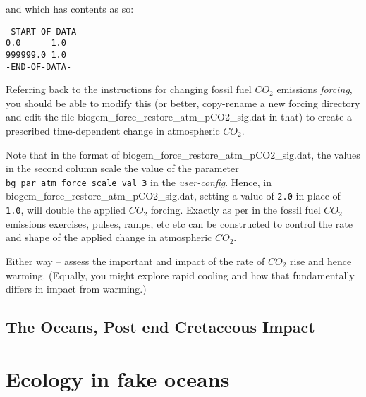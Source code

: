 \documentclass[11pt,fleqn]{book} %
\begin{document}
\begin{enumerate}[noitemsep]
\vspace{8mm}
\pagebreak 

and which has contents as so:
\vspace{-1mm}\small\begin{verbatim}
-START-OF-DATA-
0.0      1.0
999999.0 1.0
-END-OF-DATA-
\end{verbatim}\normalsize\vspace{-1mm}

Referring back to the instructions for changing fossil fuel \(CO_{2}\) emissions \textit{forcing}, you should be able to modify this (or better, copy-rename a new forcing directory and edit the file \textsf{\footnotesize biogem\_force\_restore\_atm\_pCO2\_sig.dat} in that) to create a prescribed time-dependent change in atmospheric \(CO_{2}\).

Note that in the format of \textsf{\footnotesize biogem\_force\_restore\_atm\_pCO2\_sig.dat}, the values in the second column scale the value of the parameter \texttt{bg\_par\_atm\_force\_scale\_val\_3} in the \textit{user-config}. Hence, in \textsf{\footnotesize biogem\_force\_restore\_atm\_pCO2\_sig.dat}, setting a value of \texttt{2.0} in place of \texttt{1.0}, will double the applied \(CO_{2}\) forcing. Exactly as per in the fossil fuel \(CO_{2}\) emissions exercises, pulses, ramps, etc etc can be constructed to control the rate and shape of the applied change in atmospheric \(CO_{2}\).

\end{enumerate}

\vspace{2mm}

\noindent Either way --  assess the important and impact of the rate of \(CO_{2}\) rise and hence warming. (Equally, you might explore rapid cooling and how that fundamentally differs in impact from warming.)

\newpage
\subsection*{The Oceans, Post end Cretaceous Impact}




\newpage


\section{Ecology in fake oceans}
\end{document}
